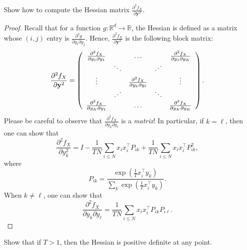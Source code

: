 \begin{exercise}
Show how to compute the Hessian matrix $\frac{\partial^2 f_X}{\partial \mathbf{y}^2}$.
\end{exercise}

\begin{proof}
Recall that for a function $g : \mathbb{R}^d \to \mathbb{R}$, the Hessian is defined as a matrix whose $(i,j)$ entry is $\frac{\partial^2 g}{\partial y_i \partial y_j}$. Hence, $\frac{\partial^2 f_X}{\partial \mathbf{y}^2}$ is the following block matrix:
%
$$\frac{\partial^2 f_X}{\partial \mathbf{y}^2} = 
\left(
\begin{array}{ccccc}
\frac{\partial^2 f_X}{\partial y_1 \partial y_1} && \ldots && \frac{\partial^2 f_X}{\partial y_1 \partial y_K}\\
& \ddots & & \reflectbox{$\ddots$} & \\
\vdots && \frac{\partial^2 f_X}{\partial y_k \partial y_\ell} && \vdots \\
& \reflectbox{$\ddots$} & & \ddots & \\
\frac{\partial^2 f_X}{\partial y_K \partial y_1} && \ldots && \frac{\partial^2 f_X}{\partial y_K \partial y_K}\\
\end{array}
\right).$$
%
Please be careful to observe that $\frac{\partial^2 f_X}{\partial y_k \partial y_\ell}$ is a \emph{matrix}! In particular, if $k = \ell$, then one can show that
%
\begin{equation}
\frac{\partial^2 f_X}{\partial y_k^2} = I - \frac{1}{TN}\sum_{i \leq N} x_i x_i^\top P_{ik} + \frac{1}{TN}\sum_{i \leq N} x_i x_i^\top P^2_{ik},
\end{equation}
%
where 
%
\begin{equation}
P_{ik} = \frac{\exp\left(\frac{1}{T}x_i^\top y_k\right)}{\sum_k \exp\left(\frac{1}{T}x_i^\top y_k\right)}.
\end{equation}
%
When $k \neq \ell$, one can show that
%
\begin{equation}
\frac{\partial^2 f_X}{\partial y_k \partial y_\ell} = \frac{1}{TN}\sum_{i \leq N} x_i x_i^\top P_{ik}P_{i\ell}.
\end{equation}
%
\end{proof}

\begin{exercise}
Show that if $T > 1$, then the Hessian is positive definite at any point.
\end{exercise}

